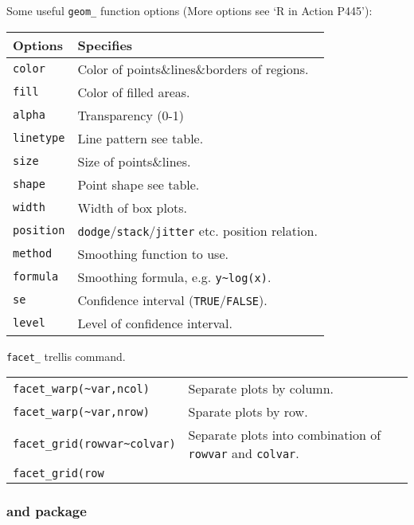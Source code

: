   Some useful \lstinline|geom_| function options (More options see `R in Action P445'):
\begin{table}[H]
    \centering
    \renewcommand\arraystretch{1}
    \begin{tabular}{l|l}
        \hline
        Options&Specifies\\\hline
        \lstinline|color|&Color of points\&lines\&borders of regions.\\
        \lstinline|fill|&Color of filled areas.\\
        \lstinline|alpha|&Transparency (0-1)\\
        \lstinline|linetype|&Line pattern see table.\\%
        \lstinline|size|&Size of points\&lines.\\
        \lstinline|shape|&Point shape see table.\\%
        \lstinline|width|&Width of box plots.\\
        \lstinline|position|&\lstinline|dodge|/\lstinline|stack|/\lstinline|jitter| etc. position relation.\\
        \hline
        \lstinline|method|&Smoothing function to use.\\
        \lstinline|formula|&Smoothing formula, e.g. \lstinline|y~log(x)|.\\
        \lstinline|se|&Confidence interval (\lstinline|TRUE|/\lstinline|FALSE|).\\
        \lstinline|level|&Level of confidence interval.\\
    \end{tabular}
\end{table}



\lstinline|facet_| trellis command.
\begin{table}[H]
    \centering
    \renewcommand\arraystretch{1}
    \begin{tabular}{l|l}
        \hline
        \lstinline|facet_warp(~var,ncol)|&Separate plots by column.\\
        \lstinline|facet_warp(~var,nrow)|&Sparate plots by row.\\
        \lstinline|facet_grid(rowvar~colvar)|&Separate plots into combination of \lstinline|rowvar| and \lstinline|colvar|.\\
        \lstinline|facet_grid(row|&\\

        \hline
    \end{tabular}
\end{table}





\subsubsection{ and  package}

